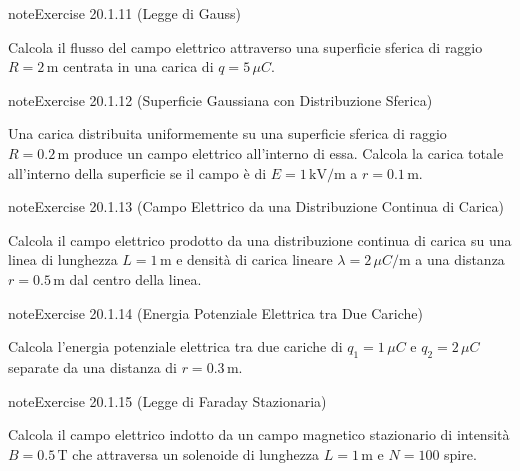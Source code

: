 \documentclass[letterpaper,10pt,italian]{jupyterBook}
\begin{document}
\begin{sphinxadmonition}{note}{Exercise 20.1.11 (Legge di Gauss)}



\sphinxAtStartPar
Calcola il flusso del campo elettrico attraverso una superficie sferica di raggio \(R = 2 \, \text{m}\) centrata in una carica di \(q = 5 \, \mu C\).
\end{sphinxadmonition}
 \label{exercise:ch/electromagnetism/electrostatics-problems-exercise-11}

\begin{sphinxadmonition}{note}{Exercise 20.1.12 (Superficie Gaussiana con Distribuzione Sferica)}



\sphinxAtStartPar
Una carica distribuita uniformemente su una superficie sferica di raggio \(R = 0.2 \, \text{m}\) produce un campo elettrico all’interno di essa. Calcola la carica totale all’interno della superficie se il campo è di \(E = 1 \, \text{kV/m}\) a \(r = 0.1 \, \text{m}\).
\end{sphinxadmonition}
 \label{exercise:ch/electromagnetism/electrostatics-problems-exercise-12}

\begin{sphinxadmonition}{note}{Exercise 20.1.13 (Campo Elettrico da una Distribuzione Continua di Carica)}



\sphinxAtStartPar
Calcola il campo elettrico prodotto da una distribuzione continua di carica su una linea di lunghezza \(L = 1 \, \text{m}\) e densità di carica lineare \(\lambda = 2 \, \mu C/\text{m}\) a una distanza \(r = 0.5 \, \text{m}\) dal centro della linea.
\end{sphinxadmonition}
 \label{exercise:ch/electromagnetism/electrostatics-problems-exercise-13}

\begin{sphinxadmonition}{note}{Exercise 20.1.14 (Energia Potenziale Elettrica tra Due Cariche)}



\sphinxAtStartPar
Calcola l’energia potenziale elettrica tra due cariche di \(q_1 = 1 \, \mu C\) e \(q_2 = 2 \, \mu C\) separate da una distanza di \(r = 0.3 \, \text{m}\).
\end{sphinxadmonition}
 \label{exercise:ch/electromagnetism/electrostatics-problems-exercise-14}

\begin{sphinxadmonition}{note}{Exercise 20.1.15 (Legge di Faraday Stazionaria)}



\sphinxAtStartPar
Calcola il campo elettrico indotto da un campo magnetico stazionario di intensità \(B = 0.5 \, \text{T}\) che attraversa un solenoide di lunghezza \(L = 1 \, \text{m}\) e \(N = 100\) spire.
\end{sphinxadmonition}
 \label{exercise:ch/electromagnetism/electrostatics-problems-exercise-15}
\end{document}
